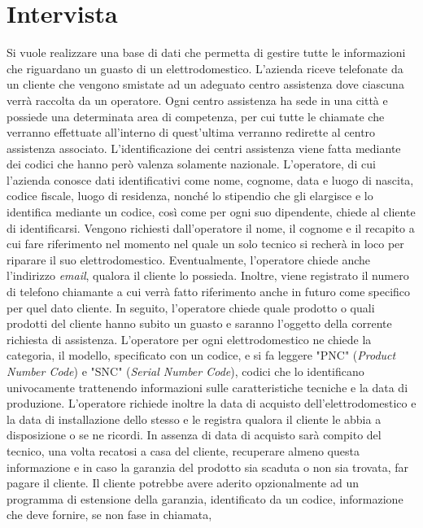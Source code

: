 \documentclass[a4paper, 12pt]{report}
\begin{document}
\section{Intervista}
Si vuole realizzare una base di dati che permetta di gestire tutte le informazioni che riguardano un guasto di un elettrodomestico.
L'azienda riceve telefonate da un cliente che vengono smistate ad un adeguato centro assistenza dove ciascuna verrà raccolta da un operatore.
Ogni centro assistenza ha sede in una città e possiede una determinata area di competenza, per cui tutte le chiamate che verranno effettuate
all'interno di quest'ultima verranno redirette al centro assistenza associato. L'identificazione dei centri assistenza viene fatta mediante dei
codici che hanno però valenza solamente nazionale.\newline
L'operatore, di cui l'azienda conosce dati identificativi come nome, cognome, data e luogo di nascita, codice fiscale, luogo di residenza, nonché lo 
stipendio che gli elargisce e lo identifica mediante un codice, così come per ogni suo dipendente, chiede al cliente di identificarsi. Vengono richiesti dall'operatore 
il nome, il cognome e il recapito a cui fare riferimento nel momento nel quale un solo tecnico si recherà in loco per riparare il suo elettrodomestico. 
Eventualmente, l'operatore chiede anche l'indirizzo \textit{email}, qualora il cliente lo possieda. Inoltre, viene registrato il numero di telefono 
chiamante a cui verrà fatto riferimento anche in futuro come specifico per quel dato cliente.\newline
In seguito, l'operatore chiede quale prodotto o quali prodotti del cliente hanno subito un guasto e saranno l'oggetto della corrente richiesta di 
assistenza. L'operatore per ogni elettrodomestico ne chiede la categoria, il modello, specificato con un codice, e si fa leggere "PNC" (\textit{Product 
Number Code}) e "SNC" (\textit{Serial Number Code}), codici che lo identificano univocamente trattenendo informazioni sulle caratteristiche tecniche e
la data di produzione. L'operatore richiede inoltre la data di acquisto dell'elettrodomestico e la data di installazione dello stesso e le registra qualora 
il cliente le abbia a disposizione o se ne ricordi. In assenza di data di acquisto sarà compito del tecnico, una volta recatosi a casa del cliente, 
recuperare almeno questa informazione e in caso la garanzia del prodotto sia scaduta o non sia trovata, far pagare il cliente. Il cliente potrebbe avere 
aderito opzionalmente ad un programma di estensione della garanzia, identificato da un codice, informazione che deve fornire, se non fase in chiamata, 
\end{document}
